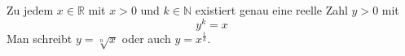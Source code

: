 Zu jedem $x \in \mathbb{R}$ mit $x > 0$ und $k \in \mathbb{N}$ existiert genau eine reelle Zahl $y > 0$ mit
$$y^k = x$$
Man schreibt $y = \sqrt[n]{x}$ oder auch $y = x^{\frac{1}{k}}$.